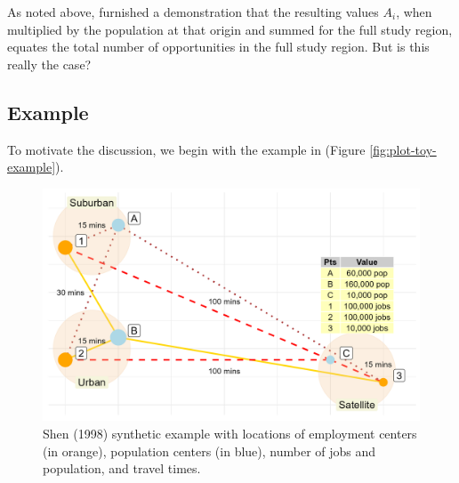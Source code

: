 \documentclass[]{elsarticle} %
\begin{document}
As noted above, \citet{shen1998} furnished a demonstration that the
resulting values \(A_i\), when multiplied by the population at that
origin and summed for the full study region, equates the total number of
opportunities in the full study region. But is this really the case?

\hypertarget{example}{%
\subsection{Example}\label{example}}

To motivate the discussion, we begin with the example in
\citet{shen1998} (Figure \ref{fig:plot-toy-example}).

\begin{figure}

{\centering \includegraphics[width=1\linewidth]{images/plot-toy-example} 

}

\caption{\label{fig:plot-toy-example} Shen (1998) synthetic example with locations of employment centers (in orange), population centers (in blue), number of jobs and population, and travel times.}\label{fig:create-figure-with-toy-example3}
\end{figure}

 
  \providecommand{\huxb}[2]{\arrayrulecolor[RGB]{#1}\global\arrayrulewidth=#2pt}
  \providecommand{\huxvb}[2]{\color[RGB]{#1}\vrule width #2pt}
  \providecommand{\huxtpad}[1]{\rule{0pt}{#1}}
  \providecommand{\huxbpad}[1]{\rule[-#1]{0pt}{#1}}
\end{document}
